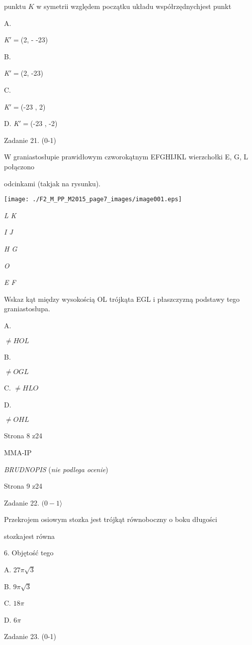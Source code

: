 \documentclass[a4paper,12pt]{article}
\begin{document}
punktu $K$ w symetrii względem początku układu współrzędnychjest punkt

A.

{\it K}$\prime =$(2, - -23)

B.

{\it K}$\prime =$(2, -23)

C.

{\it K}$\prime =$(-23 , 2)

D. {\it K}$\prime =$(-23 , -2)

Zadanie 21. (0-1)

W graniastosłupie prawidłowym czworokątnym EFGHIJKL wierzchołki E, G, L połączono

odcinkami (takjak na rysunku).
\begin{center}
\texttt{[image: ./F2\_M\_PP\_M2015\_page7\_images/image001.eps]}
\end{center}
{\it L K}

{\it I J}

{\it H G}

{\it O}

{\it E F}

Wskaz kąt między wysokością OL trójkąta EGL i płaszczyzną podstawy tego graniastosłupa.

A.

$\neq HOL$

B.

$\neq OGL$

C. $\neq HLO$

D.

$\neq OHL$

Strona 8 z24

MMA-IP





{\it BRUDNOPIS} ({\it nie podlega ocenie})

Strona 9 z24





Zadanie 22. $(0-1\rangle$

Przekrojem osiowym stozka jest trójkąt równoboczny o boku długości

stozkajest równa

6. Objętość tego

A. $27\pi\sqrt{3}$

B. $9\pi\sqrt{3}$

C. $ 18\pi$

D. $ 6\pi$

Zadanie 23. (0-1)
\end{document}
